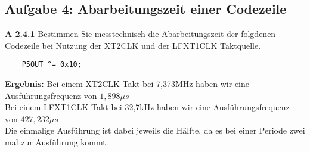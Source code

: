 \subsection*{Aufgabe 4: Abarbeitungszeit einer Codezeile}

\begin{description}

\item{\bfseries A 2.4.1} Bestimmen Sie messtechnisch die Abarbeitungszeit der folgdenen Codezeile bei Nutzung der XT2CLK und der LFXT1CLK Taktquelle.

\begin{lstlisting}
	P5OUT ^= 0x10;
\end{lstlisting}

\textbf{Ergebnis:}
Bei einem XT2CLK Takt bei 7,373MHz haben wir eine Ausführungsfrequenz von $1,898 \mu s$\\
Bei einem LFXT1CLK Takt bei 32,7kHz haben wir eine Ausführungsfrequenz von $427,232 \mu s$\\

Die einmalige Ausführung ist dabei jeweils die Hälfte, da es  bei einer Periode zwei mal zur Ausführung kommt.

\end{description}